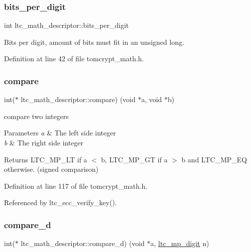 \subsubsection{\texorpdfstring{bits\_per\_digit}{bits\_per\_digit}}
{\footnotesize\ttfamily int ltc\+\_\+math\+\_\+descriptor\+::bits\+\_\+per\+\_\+digit}



Bits per digit, amount of bits must fit in an unsigned long. 



Definition at line 42 of file tomcrypt\+\_\+math.\+h.

\mbox{\label{structltc__math__descriptor_afa00530838786ca9b52a21a2c00f0f57}} 
\subsubsection{\texorpdfstring{compare}{compare}}
{\footnotesize\ttfamily int($\ast$ ltc\+\_\+math\+\_\+descriptor\+::compare) (void $\ast$a, void $\ast$b)}



compare two integers 


\begin{DoxyParams}{Parameters}
{\em a} & The left side integer \\
\hline
{\em b} & The right side integer \\
\hline
\end{DoxyParams}
\begin{DoxyReturn}{Returns}
L\+T\+C\+\_\+\+M\+P\+\_\+\+LT if a $<$ b, L\+T\+C\+\_\+\+M\+P\+\_\+\+GT if a $>$ b and L\+T\+C\+\_\+\+M\+P\+\_\+\+EQ otherwise. (signed comparison) 
\end{DoxyReturn}


Definition at line 117 of file tomcrypt\+\_\+math.\+h.



Referenced by ltc\+\_\+ecc\+\_\+verify\+\_\+key().

\mbox{\label{structltc__math__descriptor_a5b3038e00644c477282802863619323b}} 
\subsubsection{\texorpdfstring{compare\_d}{compare\_d}}
{\footnotesize\ttfamily int($\ast$ ltc\+\_\+math\+\_\+descriptor\+::compare\+\_\+d) (void $\ast$a, \mbox{\hyperlink{tomcrypt__cfg_8h_a4e98fa26a5de0ac87e06af901bad57c4}{ltc\+\_\+mp\+\_\+digit}} n)}



